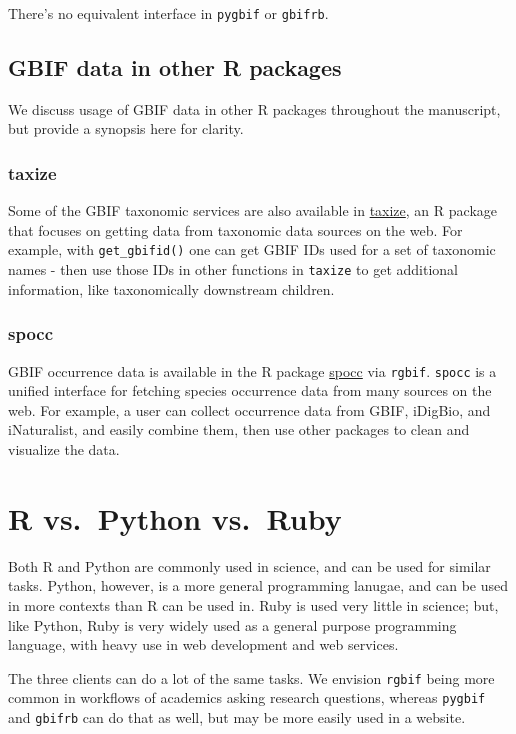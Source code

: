 \documentclass[author-year, review, 11pt]{components/elsarticle} %
\begin{document}
There's no equivalent interface in \texttt{pygbif} or \texttt{gbifrb}.

\subsection{GBIF data in other R
packages}\label{gbif-data-in-other-r-packages}

We discuss usage of GBIF data in other R packages throughout the
manuscript, but provide a synopsis here for clarity.

\subsubsection{taxize}\label{taxize}

Some of the GBIF taxonomic services are also available in
\href{https://github.com/ropensci/taxize}{taxize}, an R package that
focuses on getting data from taxonomic data sources on the web. For
example, with \texttt{get\_gbifid()} one can get GBIF IDs used for a set
of taxonomic names - then use those IDs in other functions in
\texttt{taxize} to get additional information, like taxonomically
downstream children.

\subsubsection{spocc}\label{spocc}

GBIF occurrence data is available in the R package
\href{https://github.com/ropensci/spocc}{spocc} via \texttt{rgbif}.
\texttt{spocc} is a unified interface for fetching species occurrence
data from many sources on the web. For example, a user can collect
occurrence data from GBIF, iDigBio, and iNaturalist, and easily combine
them, then use other packages to clean and visualize the data.

\section{R vs.~Python vs.~Ruby}\label{r-vs.python-vs.ruby}

Both R and Python are commonly used in science, and can be used for
similar tasks. Python, however, is a more general programming lanugae,
and can be used in more contexts than R can be used in. Ruby is used
very little in science; but, like Python, Ruby is very widely used as a
general purpose programming language, with heavy use in web development
and web services.

The three clients can do a lot of the same tasks. We envision
\texttt{rgbif} being more common in workflows of academics asking
research questions, whereas \texttt{pygbif} and \texttt{gbifrb} can do
that as well, but may be more easily used in a website.
\end{document}
